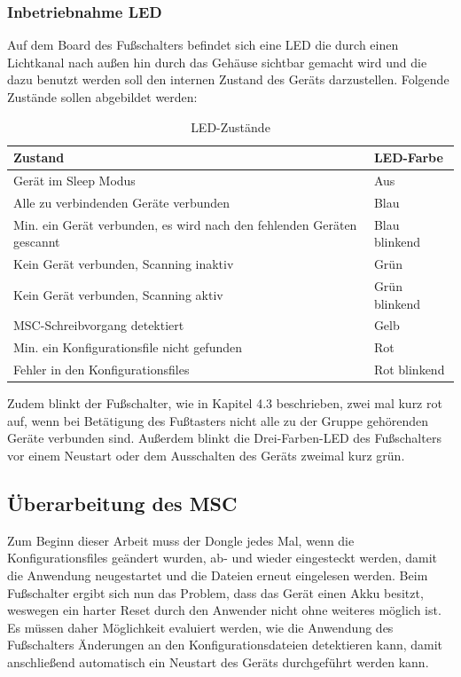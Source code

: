 \subsubsection{Inbetriebnahme LED}
Auf dem Board des Fußschalters befindet sich eine \ac{LED} die durch einen Lichtkanal nach außen hin durch das Gehäuse sichtbar gemacht wird und die dazu benutzt werden soll den internen Zustand des Geräts darzustellen. Folgende Zustände sollen abgebildet werden: 

\begin{table}[H]
	\centering
	\begin{tabular}[H]{l|l}
		Zustand & \ac{LED}-Farbe \\
		\hline
		Gerät im Sleep Modus & Aus \\
		\hline
		Alle zu verbindenden Geräte verbunden & Blau \\
		\hline
		Min. ein Gerät verbunden, es wird nach den fehlenden Geräten gescannt & Blau blinkend \\
		\hline
		Kein Gerät verbunden, Scanning inaktiv & Grün \\
		\hline
		Kein Gerät verbunden, Scanning aktiv & Grün blinkend \\
		\hline
		\ac{MSC}-Schreibvorgang detektiert & Gelb \\
		\hline
		Min. ein Konfigurationsfile nicht gefunden & Rot \\
		\hline
		Fehler in den Konfigurationsfiles & Rot blinkend \\
	\end{tabular}
	\caption{LED-Zustände}
\end{table}

Zudem blinkt der Fußschalter, wie in Kapitel 4.3 beschrieben, zwei mal kurz rot auf, wenn bei Betätigung des Fußtasters nicht alle zu der Gruppe gehörenden Geräte verbunden sind. Außerdem blinkt die Drei-Farben-\ac{LED} des Fußschalters vor einem Neustart oder dem Ausschalten des Geräts zweimal kurz grün.

\subsection{Überarbeitung des MSC}
Zum Beginn dieser Arbeit muss der Dongle jedes Mal, wenn die Konfigurationsfiles geändert wurden, ab- und wieder eingesteckt werden, damit die Anwendung neugestartet und die Dateien erneut eingelesen werden. Beim Fußschalter ergibt sich nun das Problem, dass das Gerät einen Akku besitzt, weswegen ein harter Reset durch den Anwender nicht ohne weiteres möglich ist. Es müssen daher Möglichkeit evaluiert werden, wie die Anwendung des Fußschalters Änderungen an den Konfigurationsdateien detektieren kann, damit anschließend automatisch ein Neustart des Geräts durchgeführt werden kann.

